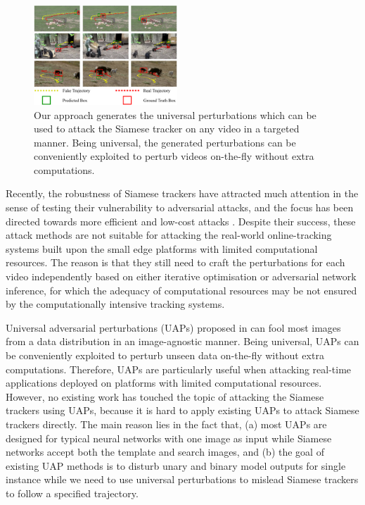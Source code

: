 \documentclass{article}
\begin{document}
\begin{figure}[htbp]
\centering
\includegraphics[width=0.48\textwidth]{images/1_v4.pdf}
\caption{Our approach generates the universal perturbations which can be used to attack the Siamese tracker on any video in a targeted manner. Being universal, the generated perturbations can be conveniently exploited to perturb videos on-the-fly without extra computations.}
\label{fig:1}
\end{figure}

Recently, the robustness of Siamese trackers have attracted much attention in the sense of testing their vulnerability to adversarial attacks, and the focus has been directed towards more efficient and low-cost attacks \cite{TTP,FAN,SPARK}. Despite their success, these attack methods are not suitable for attacking the real-world online-tracking systems built upon the small edge platforms with limited computational resources. The reason is that they still need to craft the perturbations for each video independently based on either iterative optimisation or adversarial network inference, for which the adequacy of computational resources may be not ensured by the computationally intensive tracking systems. 

Universal adversarial perturbations (UAPs) proposed in \cite{UAP} can fool most images from a data distribution in an image-agnostic manner. Being universal, UAPs can be conveniently exploited to perturb unseen data on-the-fly without extra computations. Therefore, UAPs are particularly useful when attacking real-time applications deployed on platforms with limited computational resources. However, no existing work has touched the topic of attacking the Siamese trackers using UAPs, because it is hard to apply existing UAPs to attack Siamese trackers directly. The main reason lies in the fact that, (a) most UAPs are designed for typical neural networks with one image as input while Siamese networks accept both the template and search images, and (b) the goal of existing UAP methods is to disturb unary and binary model outputs for single instance while we need to use universal perturbations to mislead Siamese trackers to follow a specified trajectory.
\end{document}
